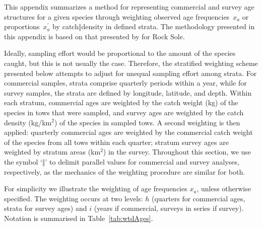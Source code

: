 \documentclass[11pt]{book}\usepackage[]{graphicx}\usepackage[]{color}
\newcommand{\sQuote}[1]{`#1'}
\newcommand{\eor}[2]{{#1$\Vert$#2}}
\begin{document}
This appendix summarizes a method for representing commercial and survey age structures for a given species through weighting observed age frequencies~$x_a$ or proportions~$x^\prime_a$ by \eor{catch}{density} in defined strata. The methodology presented in this appendix is based on that presented by \citet{rocksole2014} for Rock Sole.\\
\bigskip

Ideally, sampling effort would be proportional to the amount of the species caught, but this is not usually the case. Therefore, the stratified weighting scheme presented below attempts to adjust for unequal sampling effort among strata. For commercial samples, strata comprise quarterly periods within a year, while for survey samples, the strata are defined by longitude, latitude, and depth. Within each stratum, commercial ages are weighted by the catch weight (kg) of the species in tows that were sampled, and survey ages are weighted by the catch density (kg/km$^2$) of the species in sampled tows. A second weighting is then applied: quarterly commercial ages are weighted by the commercial catch weight of the species from all tows within each quarter; stratum survey ages are weighted by stratum areas (km$^2$) in the survey. Throughout this section, we use the symbol \sQuote{$\Vert$} to delimit parallel values for commercial and survey analyses, respectively, as the mechanics of the weighting procedure are similar for both. \\
\bigskip

For simplicity we illustrate the weighting of age frequencies $x_a$, unless otherwise specified. The weighting occurs at two levels: $h$ (quarters for commercial ages, strata for survey ages) and $i$ (years if commercial, surveys in series if survey). Notation is summarised in Table~\ref{tab:wtdAges}.\\
\bigskip
\end{document}
